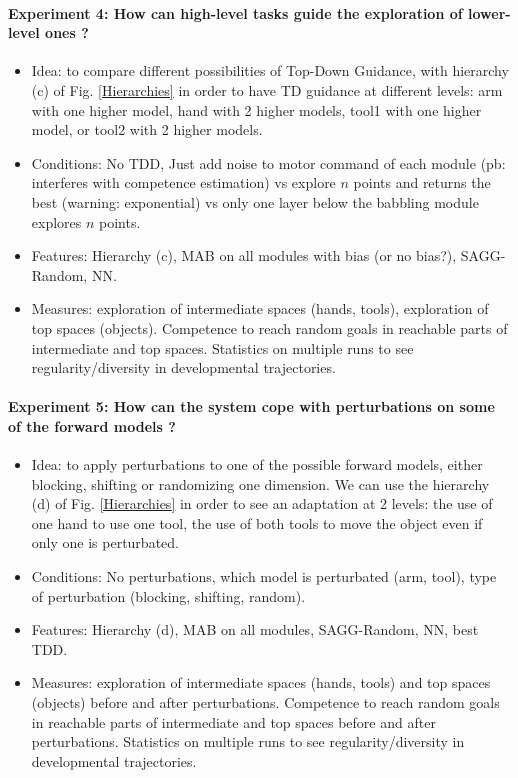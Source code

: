 \documentclass[conference]{include/IEEEtran}
\begin{document}
			\paragraph{Experiment 4: How can high-level tasks guide the exploration of lower-level ones ?}
			\begin{itemize}
				\item Idea: to compare different possibilities of Top-Down Guidance, with hierarchy (c) of Fig. \ref{Hierarchies} in order to have TD guidance at different levels: 
						arm with one higher model, hand with 2 higher models, tool1 with one higher model, or tool2 with 2 higher models.
				
				\item Conditions: No TDD, Just add noise to motor command of each module (pb: interferes with competence estimation) 
						vs explore $n$ points and returns the best (warning: exponential)
						vs only one layer below the babbling module explores $n$ points.
				
				\item Features: Hierarchy (c), MAB on all modules with bias (or no bias?), SAGG-Random, NN.
				
				\item Measures: exploration of intermediate spaces (hands, tools), exploration of top spaces (objects). Competence to reach random goals in reachable parts of intermediate and top spaces. 
						Statistics on multiple runs to see regularity/diversity in developmental trajectories.
			\end{itemize}
			
			\paragraph{Experiment 5: How can the system cope with perturbations on some of the forward models ?}
			\begin{itemize}
				\item Idea: to apply perturbations to one of the possible forward models, either blocking, shifting or randomizing one dimension. 
						We can use the hierarchy (d) of Fig. \ref{Hierarchies} in order to see an adaptation at 2 levels: the use of one hand to use one tool, the use of both tools to move the object even if only one is perturbated.
				
				\item Conditions: No perturbations, which model is perturbated (arm, tool), type of perturbation (blocking, shifting, random).
				
				\item Features: Hierarchy (d), MAB on all modules, SAGG-Random, NN, best TDD.
				
				\item Measures: exploration of intermediate spaces (hands, tools) and top spaces (objects) before and after perturbations. 
						Competence to reach random goals in reachable parts of intermediate and top spaces before and after perturbations. 
						Statistics on multiple runs to see regularity/diversity in developmental trajectories.
			\end{itemize}
\end{document}
